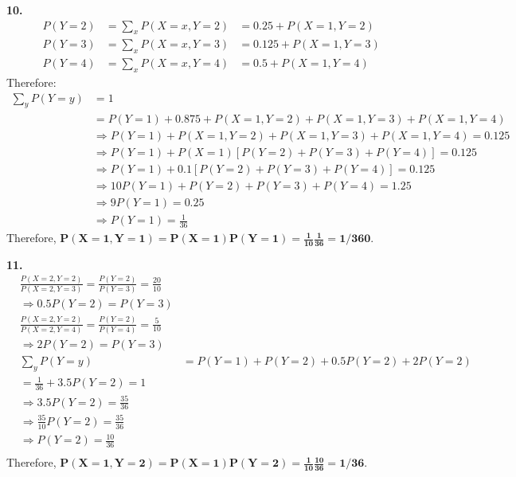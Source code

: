 \documentclass{homework}
\begin{document}
\textbf{\large 10.}
\begin{align*}
    &P(Y=2) &= \sum\limits_{x}{P(X=x, Y=2)} &= 0.25 + P(X=1, Y=2)\\
    &P(Y=3) &= \sum\limits_{x}{P(X=x, Y=3)} &= 0.125 + P(X=1, Y=3)\\
    &P(Y=4) &= \sum\limits_{x}{P(X=x, Y=4)} &= 0.5 + P(X=1, Y=4)
\end{align*}
Therefore:
\begin{align}
    \sum\limits_{y}{P(Y=y)} &= 1\\
    &= P(Y=1) + 0.875 + P(X=1, Y=2) + P(X=1, Y=3) + P(X=1, Y=4)\\
    &\Longrightarrow P(Y=1) + P(X=1, Y=2) + P(X=1, Y=3) + P(X=1, Y=4) = 0.125\\
    &\Longrightarrow P(Y=1) + P(X=1) [ P(Y=2) + P(Y=3) + P(Y=4) ] = 0.125\\
    &\Longrightarrow P(Y=1) + 0.1 [ P(Y=2) + P(Y=3) + P(Y=4) ] = 0.125\\
    &\Longrightarrow 10 P(Y=1) + P(Y=2) + P(Y=3) + P(Y=4) = 1.25\\
    &\Longrightarrow 9 P(Y=1) = 0.25\\
    &\Longrightarrow P(Y=1) = \frac{1}{36}
    \label{q4p2e2}
\end{align}
Therefore, $\mathbf{P(X=1, Y=1) = P(X=1) P(Y=1) = \frac{1}{10} \frac{1}{36} = 1/360}$.

\textbf{\large 11.}
\begin{align*}
    & \frac{P(X=2, Y=2)}{P(X=2, Y=3)} = \frac{P(Y=2)}{P(Y=3)} = \frac{20}{10}\\
    & \Longrightarrow 0.5 P(Y=2) = P(Y=3)\\
    & \frac{P(X=2, Y=2)}{P(X=2, Y=4)} = \frac{P(Y=2)}{P(Y=4)} = \frac{5}{10}\\
    & \Longrightarrow 2 P(Y=2) = P(Y=3)\\
    & \sum\limits_{y}{P(Y=y)} &= P(Y=1) + P(Y=2) + 0.5 P(Y=2) + 2 P(Y=2) \\
    & = \frac{1}{36} + 3.5 P(Y=2) = 1\\
    & \Longrightarrow  3.5 P(Y=2) = \frac{35}{36}\\
    & \Longrightarrow  \frac{35}{10} P(Y=2) = \frac{35}{36}\\
    & \Longrightarrow  P(Y=2) = \frac{10}{36}\\
\end{align*}
Therefore, $\mathbf{P(X=1, Y=2) = P(X=1) P(Y=2) = \frac{1}{10} \frac{10}{36} = 1/36}$.
\end{document}

